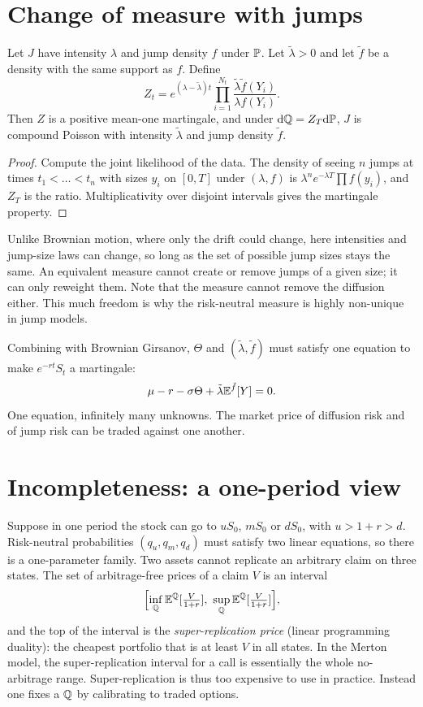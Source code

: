 \section{Change of measure with jumps}

\begin{theorem}\label{thm:girsjump}
Let $J$ have intensity $\lambda$ and jump density $f$ under $\mathbb{P}$. Let $\tilde\lambda>0$ and let $\tilde f$ be a density with the same support as $f$. Define
\[
Z_t=e^{(\lambda-\tilde\lambda)t}\prod_{i=1}^{N_t}\frac{\tilde\lambda\tilde f(Y_i)}{\lambda f(Y_i)}.
\]
Then $Z$ is a positive mean-one martingale, and under $\mathrm{d}\mathbb{Q}=Z_T\mathrm{d}\mathbb{P}$, $J$ is compound Poisson with intensity $\tilde\lambda$ and jump density $\tilde f$.
\end{theorem}
\begin{proof}
Compute the joint likelihood of the data. The density of seeing $n$ jumps at times $t_1<\dots<t_n$ with sizes $y_i$ on $[0,T]$ under $(\lambda,f)$ is $\lambda^ne^{-\lambda T}\prod f(y_i)$, and $Z_T$ is the ratio. Multiplicativity over disjoint intervals gives the martingale property.
\end{proof}

\begin{intuition}
Unlike Brownian motion, where only the drift could change, here intensities and jump-size laws can change, so long as the set of possible jump sizes stays the same. An equivalent measure cannot create or remove jumps of a given size; it can only reweight them. Note that the measure cannot remove the diffusion either. This much freedom is why the risk-neutral measure is highly non-unique in jump models.
\end{intuition}

Combining with Brownian Girsanov, $\Theta$ and $(\tilde\lambda,\tilde f)$ must satisfy one equation to make $e^{-rt}S_t$ a martingale:
\[
\mu-r-\sigma\Theta+\tilde\lambda\mathbb{E}^{\tilde f}[Y]=0.
\]
One equation, infinitely many unknowns. The market price of diffusion risk and of jump risk can be traded against one another.

\section{Incompleteness: a one-period view}

Suppose in one period the stock can go to $uS_0$, $mS_0$ or $dS_0$, with $u>1+r>d$. Risk-neutral probabilities $(q_u,q_m,q_d)$ must satisfy two linear equations, so there is a one-parameter family. Two assets cannot replicate an arbitrary claim on three states. The set of arbitrage-free prices of a claim $V$ is an interval
\[
\Bigl[\inf_{\Q}\E^\Q[\tfrac{V}{1+r}],\ \sup_{\Q}\E^\Q[\tfrac{V}{1+r}]\Bigr],
\]
and the top of the interval is the \emph{super-replication price} (linear programming duality): the cheapest portfolio that is at least $V$ in all states. In the Merton model, the super-replication interval for a call is essentially the whole no-arbitrage range. Super-replication is thus too expensive to use in practice. Instead one fixes a $\mathbb{Q}$ by calibrating to traded options.

